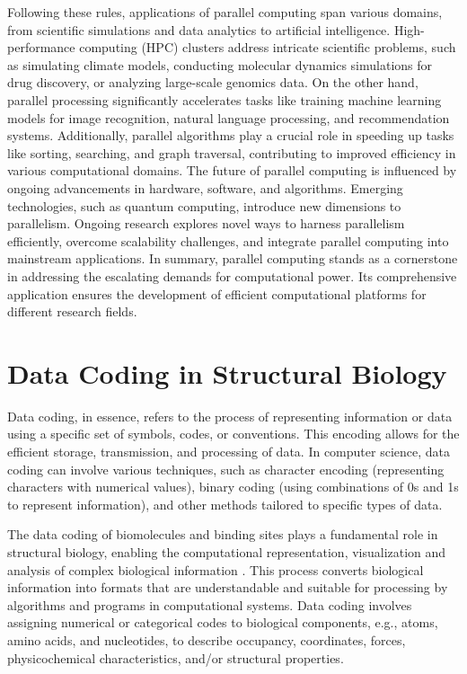 \documentclass[Ingles]{phdthesis}
\def\eg{e.g.\onedot}
\begin{document}
Following these rules, applications of parallel computing span various domains, from scientific simulations and data analytics to artificial intelligence. High-performance computing (HPC) clusters address intricate scientific problems, such as simulating climate models, conducting molecular dynamics simulations for drug discovery, or analyzing large-scale genomics data. On the other hand, parallel processing significantly accelerates tasks like training machine learning models for image recognition, natural language processing, and recommendation systems. Additionally, parallel algorithms play a crucial role in speeding up tasks like sorting, searching, and graph traversal, contributing to improved efficiency in various computational domains. The future of parallel computing is influenced by ongoing advancements in hardware, software, and algorithms. Emerging technologies, such as quantum computing, introduce new dimensions to parallelism. Ongoing research explores novel ways to harness parallelism efficiently, overcome scalability challenges, and integrate parallel computing into mainstream applications. In summary, parallel computing stands as a cornerstone in addressing the escalating demands for computational power. Its comprehensive application ensures the development of efficient computational platforms for different research fields.


\chapter{Data Coding in Structural Biology}

Data coding, in essence, refers to the process of representing information or data using a specific set of symbols, codes, or conventions. This encoding allows for the efficient storage, transmission, and processing of data. In computer science, data coding can involve various techniques, such as character encoding (representing characters with numerical values), binary coding (using combinations of 0s and 1s to represent information), and other methods tailored to specific types of data.

The data coding of biomolecules and binding sites plays a fundamental role in structural biology, enabling the computational representation, visualization and analysis of complex biological information \cite{kozlikova2016}. This process converts biological information into formats that are understandable and suitable for processing by algorithms and programs in computational systems. Data coding involves assigning numerical or categorical codes to biological components, \eg, atoms, amino acids, and nucleotides, to describe occupancy, coordinates, forces, physicochemical characteristics, and/or structural properties.
\end{document}
